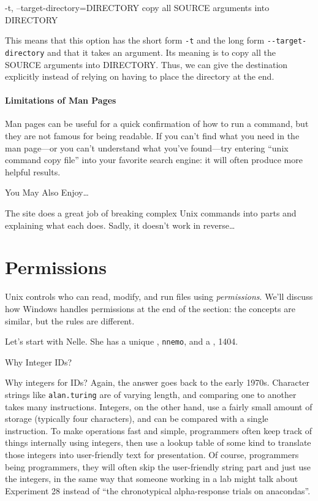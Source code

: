 \documentclass{book}
\begin{document}
\begin{VerbOut}
-t, --target-directory=DIRECTORY
     copy all SOURCE arguments into DIRECTORY
\end{VerbOut}

This means that this option has the short form \texttt{-t} and the long
form \texttt{-{}-target-directory} and that it takes an argument. Its
meaning is to copy all the SOURCE arguments into DIRECTORY. Thus, we can
give the destination explicitly instead of relying on having to place
the directory at the end.

\mbox{}\paragraph{Limitations of Man Pages}

Man pages can be useful for a quick confirmation of how to run a
command, but they are not famous for being readable. If you can't find
what you need in the man page---or you can't understand what you've
found---try entering ``unix command copy file'' into your favorite
search engine: it will often produce more helpful results.

\begin{swcbox}{You May Also Enjoy\ldots{}}

The  site does a great
job of breaking complex Unix commands into parts and explaining what
each does. Sadly, it doesn't work in reverse\ldots{}

\end{swcbox}

\section{Permissions}

Unix controls who can read, modify, and run files using
\emph{permissions}. We'll discuss how Windows handles permissions at the
end of the section: the concepts are similar, but the rules are
different.

Let's start with Nelle. She has a unique , \texttt{nnemo}, and a , 1404.

\begin{swcbox}{Why Integer IDs?}

Why integers for IDs? Again, the answer goes back to the early 1970s.
Character strings like \texttt{alan.turing} are of varying length, and
comparing one to another takes many instructions. Integers, on the other
hand, use a fairly small amount of storage (typically four characters),
and can be compared with a single instruction. To make operations fast
and simple, programmers often keep track of things internally using
integers, then use a lookup table of some kind to translate those
integers into user-friendly text for presentation. Of course,
programmers being programmers, they will often skip the user-friendly
string part and just use the integers, in the same way that someone
working in a lab might talk about Experiment 28 instead of ``the
chronotypical alpha-response trials on anacondas''.

\end{swcbox}
\end{document}

